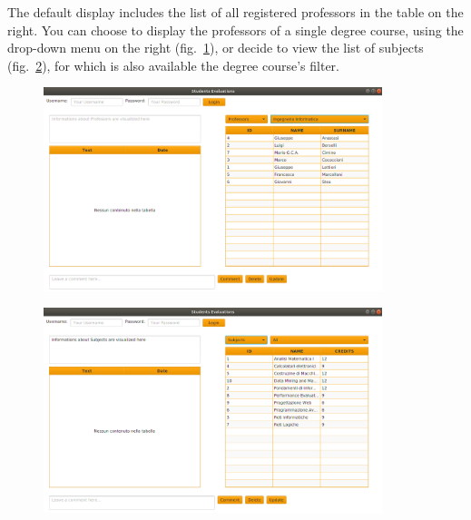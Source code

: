 \documentclass[a4paper, oneside]{article}
\begin{document}
The default display includes the list of all registered professors in the table on the right. You can choose to display the professors of a single degree course, using the drop-down menu on the right (fig.~\ref{fig:screen1}), or decide to view the list of subjects (fig.~\ref{fig:screen2}), for which is also available the degree course's filter. 

\begin{figure}[h]
\centering
\includegraphics[width=0.88\textwidth]{images/screens/screen1}
\label{fig:screen1}
\end{figure}
\clearpage
\begin{figure}[h]
\centering
\includegraphics[width=0.88\textwidth]{images/screens/screen2}
\label{fig:screen2}
\end{figure}
\end{document}
